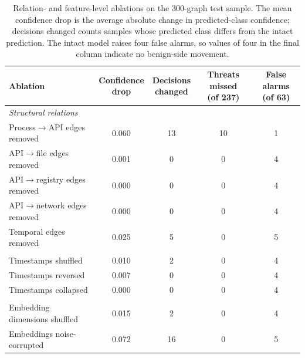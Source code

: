 \documentclass[%
    BCOR=10mm,
    DIV=13,
    toc=bibliography,
    toc=listof,
    oneside,
    12pt,
]{scrbook}
\begin{document}
\begin{table}[htbp]
\centering
\caption[Relation- and feature-level ablation results]{Relation- and
feature-level ablations on the 300-graph test sample. The mean confidence
drop is the average absolute change in predicted-class confidence; decisions
changed counts samples whose predicted class differs from the intact
prediction. The intact model raises four false alarms, so values of four in
the final column indicate no benign-side movement.}
\label{tab:relation_feature_ablation}
\small
\setlength{\tabcolsep}{4.5pt}
\begin{tabular}{l c c c c}
\toprule
Ablation & \makecell[c]{Confidence\\drop} & \makecell[c]{Decisions\\changed} &
\makecell[c]{Threats missed\\(of 237)} & \makecell[c]{False alarms\\(of 63)} \\
\midrule
\multicolumn{5}{l}{\emph{Structural relations}} \\
Process$\to$API edges removed   & 0.060 & 13 & 10 & 1 \\
API$\to$file edges removed      & 0.001 & 0  & 0  & 4 \\
API$\to$registry edges removed  & 0.000 & 0  & 0  & 4 \\
API$\to$network edges removed   & 0.000 & 0  & 0  & 4 \\
Temporal edges removed          & 0.025 & 5  & 0  & 5 \\
\addlinespace
\multicolumn{5}{l}{\emph{Temporal features}} \\
Timestamps shuffled             & 0.010 & 2  & 0  & 4 \\
Timestamps reversed             & 0.007 & 0  & 0  & 4 \\
Timestamps collapsed            & 0.000 & 0  & 0  & 4 \\
\addlinespace
\multicolumn{5}{l}{\emph{Semantic content}} \\
Embedding dimensions shuffled   & 0.015 & 2  & 0  & 4 \\
Embeddings noise-corrupted      & 0.072 & 16 & 0  & 5 \\
\bottomrule
\end{tabular}
\end{table}
\end{document}
